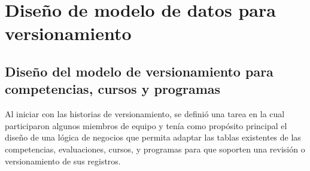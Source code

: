 \section{Diseño de modelo de datos para versionamiento}

\begin{table}[H]
\centering
\caption{Historias de usuario para el diseño de modelo de datos para versionamiento}
\label{epic:1}
\end{table}


\subsection{Diseño del modelo de versionamiento para competencias, cursos y programas}
Al iniciar con las historias de versionamiento, se definió una tarea en la cual participaron algunos miembros de equipo y tenía como propósito principal el diseño de una lógica de negocios que permita adaptar las tablas existentes de las competencias, evaluaciones, cursos, y programas para que soporten una revisión o versionamiento de sus registros.

